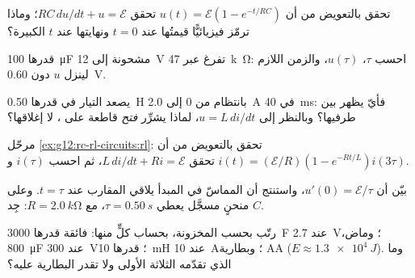 \begin{exercise}[$\star\star$]\label{exo:g12:rc-rl-circuits:7}
تحقق بالتعويض من أن $u(t) = \mathcal{E}(1 - e^{-t/RC})$
تحقق $RC\,du/dt + u = \mathcal{E}$؛ وماذا ترمّز فيزيائيًّا قيمتُها عند $t = 0$
ونهايتها عند $t$ الكبيرة؟
\end{exercise}

\begin{exercise}[$\star\star$]\label{exo:g12:rc-rl-circuits:8}
 قدرها \qty{100}{\micro F} مشحونة إلى \qty{12}{V} تفرغ عبر
\qty{47}{k\ohm}: احسب $\tau$، $u(\tau)$، والزمن اللازم لينزل $u$
دون \qty{0.60}{V}.
\end{exercise}

\begin{exercise}[$\star\star$]\label{exo:g12:rc-rl-circuits:9}
يصعد التيار في  قدرها \qty{0.50}{H} بانتظام من $0$ إلى
\qty{2.0}{A} في \qty{40}{ms}: فأيّ  يظهر بين طرفيها؟ وبالنظر إلى
$u = L\,di/dt$، لماذا يشرِّر \emph{فتح} قاطعة على ، لا إغلاقها؟
\end{exercise}

\begin{exercise}[$\star\star$]\label{exo:g12:rc-rl-circuits:10}
مرحّل \cref{ex:g12:rc-rl-circuits:rl}: تحقق بالتعويض من أن
$i(t) = (\mathcal{E}/R)(1 - e^{-Rt/L})$ تحقق
$L\,di/dt + Ri = \mathcal{E}$، ثم احسب $i(\tau)$ و$i(3\tau)$.
\end{exercise}

\begin{exercise}[$\star\star$]\label{exo:g12:rc-rl-circuits:11}
بيّن أن $u'(0) = \mathcal{E}/\tau$، واستنتج أن المماسّ في
المبدأ يلاقي المقارب عند $t = \tau$. وعلى منحنٍ مسجَّل يعطي
$\tau = \qty{0.50}{s}$، مع $R = \qty{2.0}{k\ohm}$: جِد $C$.
\end{exercise}

\begin{exercise}[$\star\star\star$]\label{exo:g12:rc-rl-circuits:12}
رتّب بحسب  المخزونة، بحساب كلٍّ منها:  فائقة قدرها \qty{3000}{F}
عند \qty{2.7}{V}؛  وماض، \qty{800}{\micro F} عند
\qty{300}{V}؛  قدرها \qty{10}{mH} عند \qty{10}{A}؛ وبطارية AA
($E \approx \qty{1.3e4}{J}$). وما الذي تقدّمه الثلاثة الأولى ولا تقدر
البطارية عليه؟
\end{exercise}

